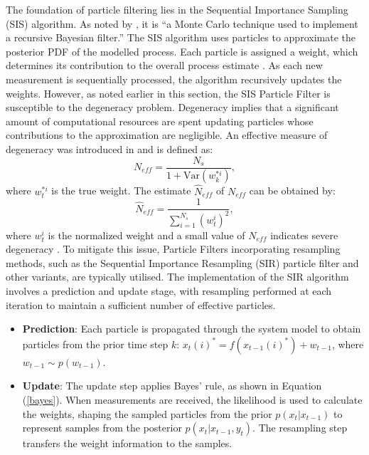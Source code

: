 The foundation of particle filtering lies in the Sequential Importance Sampling (SIS) algorithm. As noted by \cite{NJGordon}, it is ``a Monte Carlo technique used to implement a recursive Bayesian filter.'' The \ac{SIS} algorithm uses particles to approximate the posterior \ac{PDF} of the modelled process. Each particle is assigned a weight, which determines its contribution to the overall process estimate \cite{Bauermeister2016}. As each new measurement is sequentially processed, the algorithm recursively updates the weights. However, as noted earlier in this section, the SIS Particle Filter is susceptible to the degeneracy problem. Degeneracy implies that a significant amount of computational resources are spent updating particles whose contributions to the approximation are negligible. An effective measure of degeneracy was introduced in \cite{sequentialLiu} and is defined as:
\begin{equation}
    N_{eff} = \frac{N_s}{1 + \text{Var}(w^{*i}_k)},
\end{equation}
where \(w^{*i}_t\) is the true weight. The estimate \(\hat{N}_{eff}\) of \(N_{eff}\) can be obtained by:
\begin{equation}
    \hat{N}_{eff} = \frac{1}{\sum_{i=1}^{N_s} (w^i_t)^2},
    \label{352}
\end{equation}
where \(w^i_t\) is the normalized weight and a small value of \(N_{eff}\) indicates severe degeneracy \cite{Arulampalam2007}. To mitigate this issue, Particle Filters incorporating resampling methods, such as the Sequential Importance Resampling (SIR) particle filter and other variants, are typically utilised.
\newline
\newline
The implementation of the \ac{SIR} algorithm involves a prediction and update stage, with resampling performed at each iteration to maintain a sufficient number of effective particles.
\begin{itemize}
    \item \textbf{Prediction}: Each particle is propagated through the system model to obtain particles from the prior time step \(k\): \(x_t(i)^* = f(x_{t-1}(i)^*) + w_{t-1}\), where \(w_{t-1} \sim p(w_{t-1})\).
    \item \textbf{Update}: The update step applies Bayes' rule, as shown in Equation (\ref{bayes}). When measurements are received, the likelihood is used to calculate the weights, shaping the sampled particles from the prior \(p(x_t | x_{t-1})\) to represent samples from the posterior \(p(x_t | x_{t-1}, y_t)\). The resampling step transfers the weight information to the samples.
\end{itemize}

